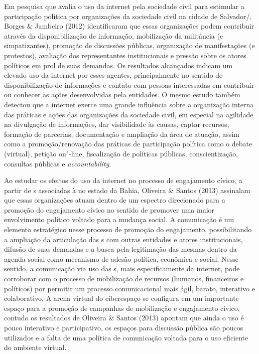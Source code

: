 Em pesquisa que avalia o uso da internet pela sociedade civil para
estimular a participação política por organizações da sociedade civil na
cidade de Salvador/, Borges \& Jambeiro (2012) identificaram que essas
organizações podem contribuir através da disponibilização de informação,
mobilização da militância (e simpatizantes), promoção de discussões
públicas, organização de manifestações (e protestos), avaliação dos
representantes institucionais e pressão sobre os atores políticos em
prol de suas demandas. Os resultados alcançados indicam um elevado uso
da internet por esses agentes, principalmente no sentido de
disponibilização de informações e contato com pessoas interessadas em
contribuir ou conhecer as ações desenvolvidas pela entidades. O mesmo
estudo também detectou que a internet exerce uma grande influência sobre
a organização interna das práticas e ações das organizações da sociedade
civil, em especial na agilidade na divulgação de informações, dar
visibilidade às causas, captar recursos, formação de parcerias,
documentação e ampliação da área de atuação, assim como a
promoção/renovação das práticas de participação política como o debate
(virtual), petição on"-line, fiscalização de políticas públicas,
conscientização, consultas públicas e \emph{accountability}.

Ao estudar os efeitos do uso da internet no processo de engajamento
cívico, a partir de s associadas à  no estado da Bahia, Oliveira
\& Santos (2013) assinalam que essas organizações atuam dentro de um
espectro direcionado para a promoção do engajamento cívico no sentido de
promover uma maior envolvimento político voltado para a mudança social.
A comunicação é um elemento estratégico nesse processo de promoção do
engajamento, possibilitando a ampliação da articulação das s com
outras entidades e atores institucionais, difusão de suas demandas e a
busca pela legitimação das mesmas dentro da agenda social como mecanismo
de adesão política, econômica e social. Nesse sentido, a comunicação via
uso das s, mais especificamente da internet, pode corroborar com o
processo de mobilização de recursos (humanos, financeiros e políticos)
por permitir um processo comunicacional mais ágil, barato, interativo e
colaborativo. A arena virtual do ciberespaço se configura em um
importante espaço para a promoção de campanhas de mobilização e
engajamento cívico, contudo os resultados de Oliveira \& Santos (2013)
apontam que ainda o uso é pouco interativo e participativo, os espaços
para discussão pública são poucos utilizados e a falta de uma política
de comunicação voltada para o uso eficiente do ambiente virtual.

